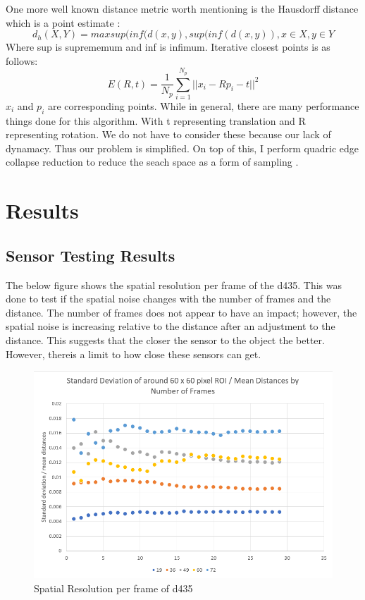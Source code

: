 One more well known distance metric worth mentioning is the Hausdorff distance which is a point estimate \cite{huttenlocher1993comparing}:
\begin{equation}
	d_h(X, Y) = max{sup(inf(d(x, y),sup(inf(d(x,y))}, x\in X, y\in Y
\end{equation}
Where sup is suprememum and inf is infimum.
Iterative closest points is as follows:
\begin{equation}
	E(R, t) = \frac{1}{N_p}\sum_{i=1}^{N_p}||x_i - Rp_i - t||^2
\end{equation}
$x_i$ and $p_i$ are corresponding points.
While in general, there are many performance things done for this algorithm. With t representing translation and R representing rotation. We do not have to consider these because our lack of dynamacy. Thus our problem is simplified. On top of this, I perform quadric edge collapse reduction to reduce the seach space as a form of sampling \cite{hussain2004efficient}.
\chapter{Results}
\section{Sensor Testing Results}
The below figure shows the spatial resolution per frame of the d435. This was done to test if the spatial noise changes with the number of frames and the distance. The number of frames does not appear to have an impact; however, the spatial noise is increasing relative to the distance after an adjustment to the distance. This suggests that the closer the sensor to the object the better. However, thereis a limit to how close these sensors can get.
\begin{figure}[h]
	\caption{Spatial Resolution per frame of d435}
	\centering
\includegraphics{images/d435_spatial_resolution.png}
\end{figure}

